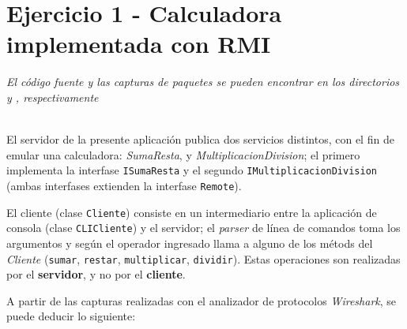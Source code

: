 






\clearpage
\tableofcontents
\clearpage 

\lstset{style=cstyle}

\section{Ejercicio 1 - Calculadora implementada con RMI}

\emph{El código fuente y las capturas de paquetes se pueden encontrar en los directorios  y , respectivamente} 

~\\

El servidor de la presente aplicación publica dos servicios distintos, con el fin de emular una calculadora: \emph{SumaResta}, y \emph{MultiplicacionDivision}; el primero implementa la interfase \texttt{ISumaResta} y el segundo \texttt{IMultiplicacionDivision} (ambas interfases extienden la interfase \texttt{Remote}). 

El cliente (clase \texttt{Cliente}) consiste en un intermediario entre la aplicación de consola (clase \texttt{CLICliente}) y el servidor; el \emph{parser} de línea de comandos toma los argumentos y según el operador ingresado llama a alguno de los métods del \emph{Cliente} (\texttt{sumar}, \texttt{restar}, \texttt{multiplicar}, \texttt{dividir}). Estas operaciones son realizadas por el \textbf{servidor}, y no por el \textbf{cliente}.

A partir de las capturas realizadas con el analizador de protocolos \emph{Wireshark}, se puede deducir lo siguiente:

